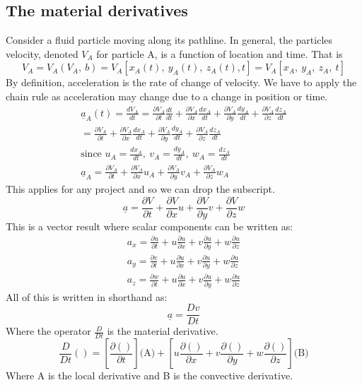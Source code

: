 \documentclass[class=report, crop=false, 12pt,a4paper]{standalone}
\begin{document}
\subsection{The material derivatives}
Consider a fluid particle moving along its pathline. In general, the particles velocity, denoted \(V_A\) for particle A, is a function of location and time. That is
\begin{equation} 
  V_A = V_A(V_A, \ b) = V_A \left[ x_A(t), \ y_A(t), \ z_A(t), t \right] = V_A \left[ x_A, \ y_A, \ z_A,\  t \right] 
\end{equation}
By definition, acceleration is the rate of change of velocity. We have to apply the chain rule as acceleration may change due to a change in position or time. 
\begin{gather} 
  \underline{a}_A(t) = \frac{dV_A}{dt} = \frac{\partial V_A}{\partial t} \frac{dt}{dt} + \frac{\partial V_A}{\partial x} \frac{dx_A}{dt} + \frac{\partial V_A}{\partial y} \frac{dy_A}{dt} + \frac{\partial V_A}{\partial z} \frac{dz_A}{dt} \\
  = \frac{\partial V_A}{\partial t} + \frac{\partial V_A}{\partial x} \frac{dx_A}{dt} + \frac{\partial V_A}{\partial y} \frac{dy_A}{dt} + \frac{\partial V_A}{\partial z} \frac{dz_A}{dt} \\
  \textrm{since } u_A = \frac{dx_A}{dt}, \ v_A = \frac{dy_A}{dt}, \ w_A = \frac{dz_A}{dt} \\
  \underline{a}_A = \frac{\partial V_A}{\partial t} + \frac{\partial V_A}{\partial x} u_A + \frac{\partial V_A}{\partial y} v_A + \frac{\partial V_A}{\partial z} w_A
\end{gather}
This applies for any project and so we can drop the subscript.
\begin{equation} 
  \underline{a} = \frac{\partial V}{\partial t} + \frac{\partial V}{\partial x} u + \frac{\partial V}{\partial y} v + \frac{\partial V}{\partial z} w 
\end{equation}
This is a vector result where scalar components can be written as:
\begin{gather}
  a_x = \frac{\partial u}{\partial t} + u\frac{\partial u}{\partial x} + v\frac{\partial u}{\partial y} + w\frac{\partial u}{\partial z} \\
  a_y = \frac{\partial v}{\partial t} + u\frac{\partial u}{\partial x} + v\frac{\partial u}{\partial y} + w\frac{\partial u}{\partial z} \\
  a_z = \frac{\partial w}{\partial t} + u\frac{\partial u}{\partial x} + v\frac{\partial u}{\partial y} + w\frac{\partial u}{\partial z}
\end{gather}
All of this is written in shorthand as:
\begin{equation} 
  \underline{a} = \frac{Dv}{Dt}
\end{equation}
Where the operator \( \frac{D}{Dt}\) is the material derivative. 
\begin{equation} 
  \frac{D}{Dt}() = \left[\frac{\partial ()}{\partial t} \right] \textrm{(A)} + \left[u\frac{\partial ()}{\partial x} + v\frac{\partial ()}{\partial y} + w\frac{\partial ()}{\partial z} \right] \textrm{(B)}
\end{equation}
Where A is the local derivative and B is the convective derivative. 
\end{document}
